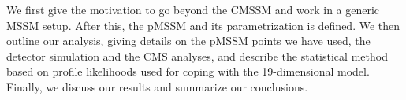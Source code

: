 We first give the motivation to go beyond the CMSSM and work in 
a generic MSSM setup. After this, the pMSSM and its parametrization is defined. 
We then outline our analysis, giving details on the pMSSM points we have used, 
the detector simulation and the CMS analyses, and describe the statistical method based on 
profile likelihoods used for coping with the 19-dimensional model. Finally, we discuss our results and summarize our conclusions.

